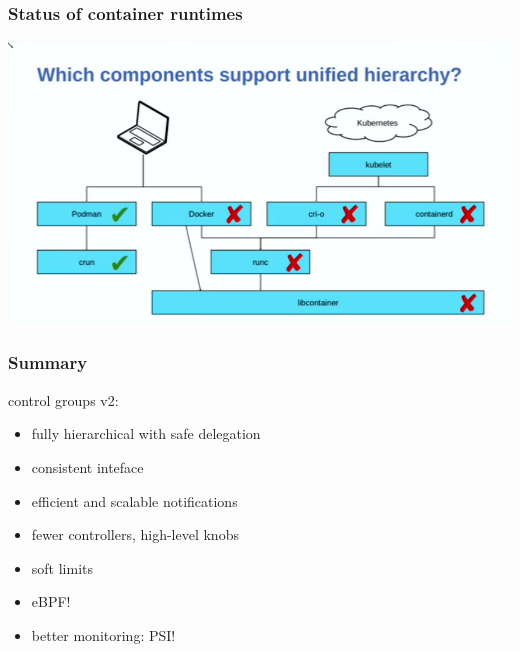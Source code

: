 \documentclass[serif]{beamer}
\begin{document}


\begin{frame}
  \frametitle{Status of container runtimes}

  \includegraphics[width=\textwidth]{images/container-runtime-status.png}
\end{frame}



\begin{frame}
  \frametitle{Summary}

  control groups v2:
  \begin{itemize}
  \item fully hierarchical with safe delegation
  \item consistent inteface
  \item efficient and scalable notifications
  \item fewer controllers, high-level knobs
  \item soft limits
  \item eBPF!
  \item better monitoring: PSI!
  \end{itemize}
\end{frame}
\end{document}
